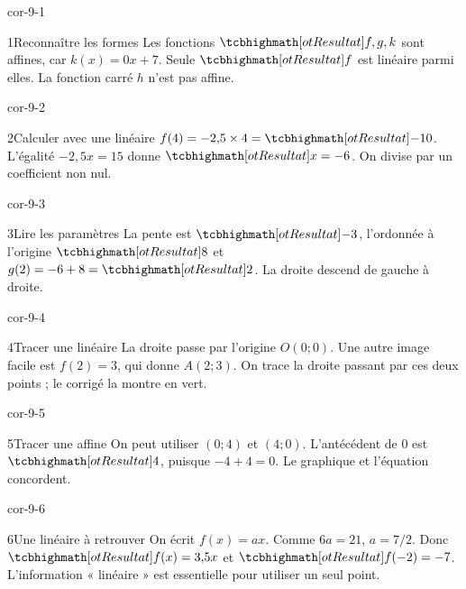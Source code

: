\clearpage\pagestyle{otMain}\fontsize{11}{15}\selectfont{}
\begin{blocLivre}{cor-9-1}\begin{corrige}{1}{Reconnaître les formes}
Les fonctions $\res{f,g,k}$ sont affines, car $k(x)=0x+7$. Seule $\res f$ est linéaire parmi elles. La fonction carré $h$ n’est pas affine.
\end{corrige}\end{blocLivre}
\begin{blocLivre}{cor-9-2}\begin{corrige}{2}{Calculer avec une linéaire}
$f(4)=-2{,}5\times4=\res{-10}$. L’égalité $-2{,}5x=15$ donne $\res{x=-6}$. On divise par un coefficient non nul.
\end{corrige}\end{blocLivre}
\begin{blocLivre}{cor-9-3}\begin{corrige}{3}{Lire les paramètres}
La pente est $\res{-3}$, l’ordonnée à l’origine $\res8$ et $g(2)=-6+8=\res2$. La droite descend de gauche à droite.
\end{corrige}\end{blocLivre}
\begin{blocLivre}{cor-9-4}\begin{corrige}{4}{Tracer une linéaire}
La droite passe par l’origine $O(0;0)$. Une autre image facile est $f(2)=3$, qui donne $A(2;3)$. On trace la droite passant par ces deux points ; le corrigé la montre en vert.
\label{fig-cor-9-4}
\end{corrige}\end{blocLivre}
\begin{blocLivre}{cor-9-5}\begin{corrige}{5}{Tracer une affine}
On peut utiliser $(0;4)$ et $(4;0)$. L’antécédent de 0 est $\res4$, puisque $-4+4=0$. Le graphique et l’équation concordent.
\label{fig-cor-9-5}
\end{corrige}\end{blocLivre}
\begin{blocLivre}{cor-9-6}\begin{corrige}{6}{Une linéaire à retrouver}
On écrit $f(x)=ax$. Comme $6a=21$, $a=7/2$. Donc $\res{f(x)=3{,}5x}$ et $\res{f(-2)=-7}$. L’information « linéaire » est essentielle pour utiliser un seul point.
\end{corrige}\end{blocLivre}
